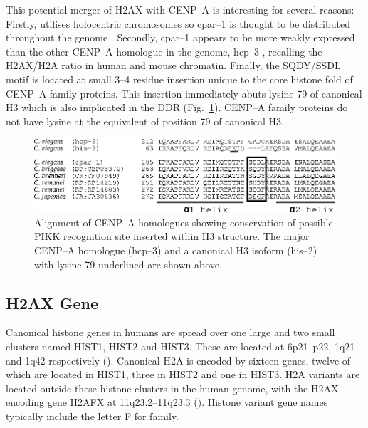 This potential merger of H2AX with \mbox{CENP--A} is interesting for several reasons: Firstly,
 utilises holocentric chromosomes so \mbox{cpar--1} is thought to be distributed
throughout the genome \citep{MMH+05}. Secondly, \mbox{cpar--1} appears to be more weakly expressed
than the other \mbox{CENP--A} homologue in the  genome, \mbox{hcp--3} \citep{MMH+05},
recalling the H2AX/H2A ratio in human and mouse chromatin. Finally, the SQDY/SSDL motif is located
at small 3--4 residue insertion unique to the core histone fold of \mbox{CENP--A} family proteins.
This insertion immediately abuts lysine 79 of canonical H3 which is also implicated in the DDR
(Fig.\ \ref{fig:h2ax-review:celegans})\@. \mbox{CENP--A} family proteins do not have lysine at the equivalent of
position 79 of canonical H3.

\begin{figure}
\centering
\includegraphics{Fig1}
\caption{Alignment of \protect{} \protect\mbox{CENP--A} homologues showing
conservation of possible PIKK recognition site inserted within H3 structure. The major
\protect{} \protect\mbox{CENP--A} homologue (\protect\mbox{hcp--3}) and a canonical
H3 isoform (\protect\mbox{his--2}) with lysine 79 underlined are shown above.}
\label{fig:h2ax-review:celegans}
\end{figure}

\subsection{H2AX Gene}
Canonical histone genes in humans are spread over one large and two small clusters named HIST1,
HIST2 and HIST3. These are located at 6p21--p22, 1q21 and 1q42 respectively ().
Canonical H2A is encoded by sixteen genes, twelve of which are located in HIST1, three in HIST2 and
one in HIST3. H2A variants are located outside these histone clusters in the human genome, with the
H2AX--encoding gene H2AFX at 11q23.2--11q23.3 \citep{IZP+94} ().
Histone variant gene names typically include the letter F for family.

